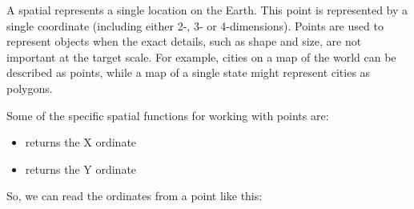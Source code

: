 \documentclass[a4paper,11pt,english]{sphinxmanual}
\begin{document}
A spatial  represents a single location on the Earth.  This point is represented by a single coordinate (including either 2-, 3- or 4-dimensions).  Points are used to represent objects when the exact details, such as shape and size, are not important at the target scale.  For example, cities on a map of the world can be described as points, while a map of a single state might represent cities as polygons.

\begin{sphinxVerbatim}[commandchars=\\\{\}]
 
   
     
\end{sphinxVerbatim}

\begin{sphinxVerbatim}[commandchars=\\\{\}]
 
\end{sphinxVerbatim}

Some of the specific spatial functions for working with points are:
\begin{itemize}
\item {} 
 returns the X ordinate

\item {} 
 returns the Y ordinate

\end{itemize}

So, we can read the ordinates from a point like this:

\begin{sphinxVerbatim}[commandchars=\\\{\}]
  
   
     
\end{sphinxVerbatim}

\begin{sphinxVerbatim}[commandchars=\\\{\}]
   
         
\end{sphinxVerbatim}
\end{document}
